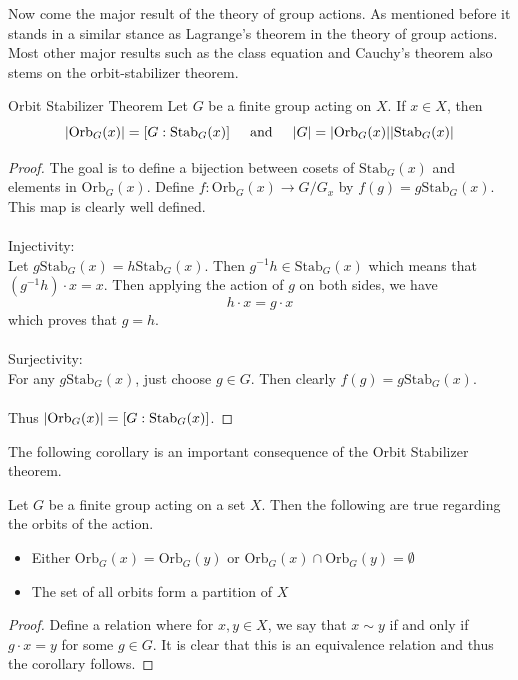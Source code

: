 \documentclass[a4paper]{article}
\begin{document}
Now come the major result of the theory of group actions. As mentioned before it stands in a similar stance as Lagrange's theorem in the theory of group actions. Most other major results such as the class equation and Cauchy's theorem also stems on the orbit-stabilizer theorem. 

\begin{thm}{Orbit Stabilizer Theorem}{} Let $G$ be a finite group acting on $X$. If $x\in X$, then $$\abs{\text{Orb}_G(x)}=[G:\text{Stab}_G(x)]\;\;\;\;\text{ and }\;\;\;\;\abs{G}=\abs{\text{Orb}_G(x)}\abs{\text{Stab}_G(x)}$$ \tcbline
\begin{proof}
The goal is to define a bijection between cosets of $\text{Stab}_G(x)$ and elements in $\text{Orb}_G(x)$. Define $f:\text{Orb}_G(x)\to G/G_x$ by $f(g)=g\text{Stab}_G(x)$. This map is clearly well defined. \\~\\
Injectivity: \\
Let $g\text{Stab}_G(x)=h\text{Stab}_G(x)$. Then $g^{-1}h\in\text{Stab}_G(x)$ which means that $(g^{-1}h)\cdot x=x$. Then applying the action of $g$ on both sides, we have $$h\cdot x=g\cdot x$$ which proves that $g=h$. \\~\\
Surjectivity: \\
For any $g\text{Stab}_G(x)$, just choose $g\in G$. Then clearly $f(g)=g\text{Stab}_G(x)$. \\~\\
Thus $\abs{\text{Orb}_G(x)}=[G:\text{Stab}_G(x)]$. 
\end{proof}
\end{thm}

The following corollary is an important consequence of the Orbit Stabilizer theorem. 

\begin{crl}{}{} Let $G$ be a finite group acting on a set $X$. Then the following are true regarding the orbits of the action. 
\begin{itemize}
\item Either $\text{Orb}_G(x)=\text{Orb}_G(y)$ or $\text{Orb}_G(x)\cap\text{Orb}_G(y)=\emptyset$
\item The set of all orbits form a partition of $X$
\end{itemize}\tcbline
\begin{proof}
Define a relation where for $x,y\in X$, we say that $x\sim y$ if and only if $g\cdot x=y$ for some $g\in G$. It is clear that this is an equivalence relation and thus the corollary follows. 
\end{proof}
\end{crl}
\end{document}

